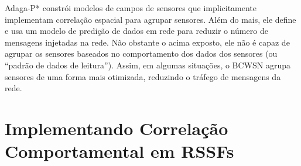 \documentclass{acm_proc_article-sp}
\begin{document}

Adaga-P* \cite{MaiaACR2013} constrói modelos de campos de sensores que
implicitamente implementam correlação espacial para agrupar sensores.
Além do mais, ele define e usa um modelo de predição de dados em rede para
reduzir o número de mensagens injetadas na rede. Não obstante o acima exposto,
ele não é capaz de agrupar os sensores baseados no comportamento dos dados dos
sensores (ou ``padrão de dados de leitura''). Assim, em algumas situações, o
BCWSN agrupa sensores de uma forma mais otimizada, reduzindo o tráfego de
mensagens da rede.
\vspace*{-.3cm}

\section{Implementando Correlação Comportamental em RSSFs}
\label{implementing-bcwsn}
\end{document}

